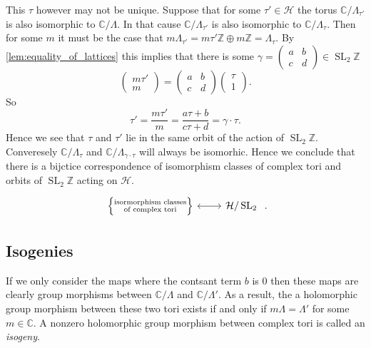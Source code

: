 \documentclass[a4paper]{article}
\theoremstyle{theoremdd}
\theoremstyle{definitiondd}
\theoremstyle{remarkdd}
\newcommand{\Z}{\mathbb{Z}}
\newcommand{\C}{\mathbb{C}}
\DeclareMathOperator{\SL}{SL}
\begin{document}
This $\tau$ however may not be unique. Suppose that for some $\tau' \in \mathcal{H} $ the torus $\C / \Lambda_{\tau'}$ is also isomorphic to $\C / \Lambda$. In that cause $\C / \Lambda_{\tau'}$ is also isomorphic to $\C / \Lambda_{\tau}$. 
Then for some $m$ it must be the case that $m \Lambda_{\tau'} = m\tau' \Z \oplus m \Z = \Lambda_\tau$. 
By \cref{lem:equality_of_lattices} this implies that there is some $\gamma = \begin{pmatrix} a & b \\ c& d \end{pmatrix}  \in \SL_2\Z$ \[
\begin{pmatrix} m\tau' \\ m \end{pmatrix}  = \begin{pmatrix} a & b \\ c& d \end{pmatrix}  \begin{pmatrix} \tau \\ 1 \end{pmatrix} 
.\] 
So \[
\tau' = \frac{m \tau'}{m} = \frac{a \tau + b}{c \tau + d} = \gamma\cdot \tau
.\] 
Hence we see that $\tau$ and $\tau'$ lie in the same orbit of the action of $\SL_2\Z$. 
Converesely $\C / \Lambda_\tau$ and $\C / \Lambda_{\gamma\cdot \tau}$ will always be isomorhic.
Hence we conclude that there is a bijctice correspondence of isomorphism classes of complex tori and orbits of $\SL_2\Z$ acting on $\mathcal{H} $.\[
\begin{tikzcd}
	\left\{ \substack{\text{isormorphism classes} \\ \text{of complex tori}} \right\} \arrow[r, leftrightarrow] & 
	\mathcal{H} / \SL_2\ 
\end{tikzcd}
.\] 
\subsection{Isogenies}
If we only consider the maps where the contsant term $b$ is $0$ then these maps are clearly group morphisms between $\C / \Lambda$ and  $\C / \Lambda'$. 
As a result, the a holomorphic group morphism between these two tori exists if and only if $m\Lambda = \Lambda'$ for some $m \in \C$. 
A nonzero holomorphic group morphism between complex tori is called an \emph{isogeny}.
\end{document}
